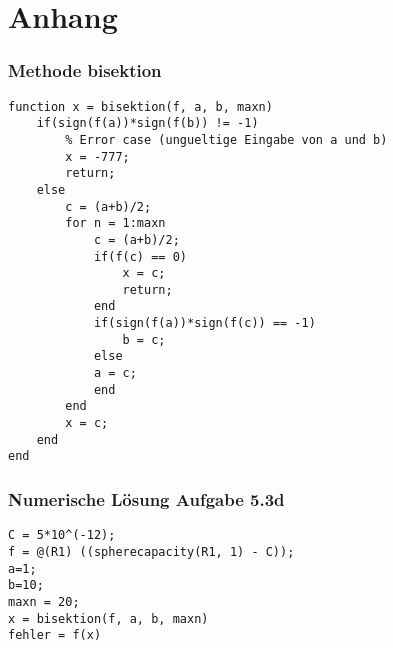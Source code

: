 \chapter{Anhang}\label{sec:anhang}






\subsection*{Methode bisektion}
\begin{lstlisting}[caption={Methode \texttt{bisektion} in Octave. Falls \texttt{a} und \texttt{b} unterschiedliche Vorzeichen haben, konvergiert die Methode gegen eine der Nullstellen aus diesem Intervall. Durch \texttt{maxn} wird die Anzahl der Iterationsschritte und somit auch die Abbruchbedingung definiert}, label=list:bisektion]
function x = bisektion(f, a, b, maxn)
	if(sign(f(a))*sign(f(b)) != -1)
		% Error case (ungueltige Eingabe von a und b)
		x = -777;
		return;
	else
		c = (a+b)/2;
		for n = 1:maxn
			c = (a+b)/2;
			if(f(c) == 0)
				x = c;
				return;
			end
			if(sign(f(a))*sign(f(c)) == -1)
				b = c;
			else
			a = c;
			end
		end
		x = c;
	end
end
\end{lstlisting}

\subsection*{Numerische Lösung Aufgabe 5.3d}
\begin{lstlisting}[caption={Numerische Lösung der Aufgabe 5.3d, durch Umwandlung in ein Nullstellen-Problem}, label=list:ag5.3d]
C = 5*10^(-12);
f = @(R1) ((spherecapacity(R1, 1) - C));
a=1;
b=10;
maxn = 20;
x = bisektion(f, a, b, maxn)
fehler = f(x)
\end{lstlisting}
